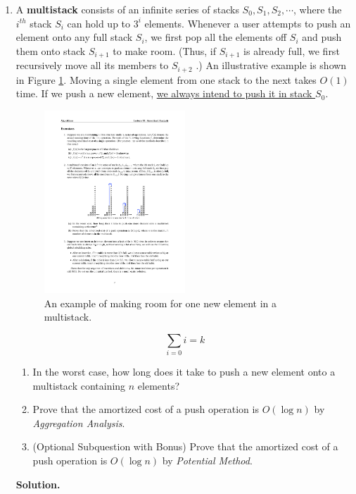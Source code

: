 \documentclass[12pt,a4paper]{article}
\theoremstyle{definition}
\begin{document}
\begin{enumerate}
	\item A \textbf{multistack} consists of an infinite series of stacks $S_0, S_1, S_2,\cdots$, where the $i^{th}$ stack $S_i$ can hold up to $3^i$ elements. Whenever a user attempts to push an element onto any full stack $S_i$, we first pop all the elements off $S_i$ and push them onto stack $S_{i+1}$ to make room. (Thus, if $S_{i+1}$ is already full, we first recursively move all its members to $S_{i+2}$ .) An illustrative example is shown in Figure \ref{Fig-MultiStack}. Moving a single element from one stack to the next takes $O(1)$ time. If we push a new element, \underline{we always intend to push it in stack $S_0$}.

	\begin{figure}[!htbp]
	\centering
	\includegraphics[width=0.5\textwidth]{Fig-MultiStack.pdf}
	\caption{An example of making room for one new element in a multistack.}
	\label{Fig-MultiStack}
	\end{figure}

	\newpage

	$$\sum_{i=0}{i=k}$$
    \begin{enumerate}
        \item In the worst case, how long does it take to push a new element onto a multistack containing $n$ elements?
        \item Prove that the amortized cost of a push operation is $O(\log n)$ by \emph{Aggregation Analysis}.
        \item {\color{red}(Optional Subquestion with Bonus)} Prove that the amortized cost of a push operation is $O(\log n)$ by \emph{Potential Method}.
    \end{enumerate}
	
	
	\textbf{Solution.}


\end{enumerate}
\end{document}
